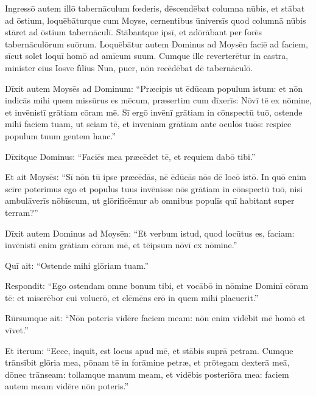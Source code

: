Ingressō autem illō
tabernāculum fœderis, dēscendēbat columna nūbis, et stābat ad ōstium,
loquēbāturque cum Moyse, 
cernentibus ūniversīs quod
columnā nūbis stāret ad ōstium tabernāculī. Stābantque
ipsī, et adōrābant per forēs tabernāculōrum suōrum. 
Loquēbātur autem Dominus ad Moysēn faciē ad faciem, sīcut solet loquī homō
ad amīcum suum. Cumque ille reverterētur in castra, minister eius Iosve
fīlius Nun, puer, nōn recēdēbat dē
tabernāculō. 

Dīxit autem Moysēs ad Dominum:
``Præcipis ut ēdūcam populum istum: et nōn
indicās mihi quem missūrus es mēcum,
præsertim cum dīxerīs: Nōvī tē ex nōmine, et
invēnistī grātiam cōram mē. 
Sī ergō invēnī grātiam in cōnspectū tuō,
ostende mihi faciem tuam, ut sciam tē, et inveniam grātiam ante oculōs tuōs:
respice populum tuum gentem hanc.''

Dīxitque Dominus: ``Faciēs mea præcēdet tē, et
requiem dabō tibi.''

Et ait
Moysēs: ``Sī nōn tū ipse præcēdās, nē ēdūcās nōs dē locō istō. 
In quō
enim scīre poterimus ego et populus tuus invēnisse nōs grātiam in cōnspectū
tuō, nisi ambulāverīs nōbīscum, ut glōrificēmur ab omnibus populīs quī habitant super terram?''

Dīxit
autem Dominus ad Moysēn: ``Et verbum istud, quod locūtus es, faciam:
invēnistī enim grātiam cōram mē, et tēipsum nōvī ex nōmine.''

Quī ait: ``Ostende mihi glōriam tuam.''

Respondit: ``Ego ostendam omne bonum tibi, et
vocābō in nōmine Dominī cōram tē: et miserēbor cui
voluerō, et clēmēns erō in quem mihi placuerit.''

Rūrsumque ait: ``Nōn poteris vidēre faciem meam: nōn enim
vidēbit mē homō et vīvet.'' 

Et iterum: ``Ecce, inquit, est locus apud mē,
et stābis suprā petram.
Cumque trānsībit
glōria mea, pōnam tē in forāmine petræ, et
prōtegam dexterā meā, dōnec trānseam: 
tollamque manum
meam, et vidēbis posteriōra mea: faciem autem meam vidēre nōn poteris.''

